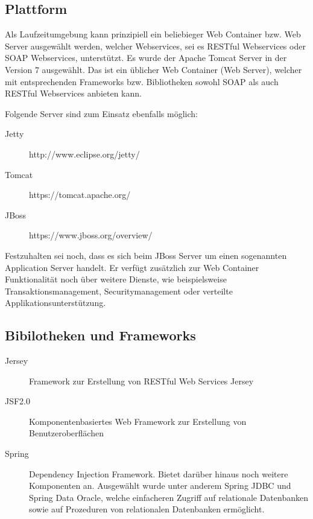 \subsection{Plattform}  \label{sec:plattform}
Als Laufzeitumgebung kann prinzipiell ein beliebieger Web Container bzw. Web Server ausgewählt werden, welcher Webservices, sei es \gls{REST}ful \glspl{Webservice} oder \gls{SOAP} \glspl{Webservice}, unterstützt. 
Es wurde der \gls{Apache Tomcat} Server in der Version 7 ausgewählt. Das ist ein üblicher Web Container (Web Server), welcher mit entsprechenden Frameworks bzw. Bibliotheken sowohl \gls{SOAP} als auch \gls{REST}ful \glspl{Webservice} anbieten kann. 

Folgende Server sind zum Einsatz ebenfalls möglich:

\begin{description}
\item[Jetty] http://www.eclipse.org/jetty/
\item[Tomcat] https://tomcat.apache.org/
\item[JBoss] https://www.jboss.org/overview/
\end{description}

Festzuhalten sei noch, dass es sich beim JBoss Server um einen sogenannten Application Server handelt. Er verfügt zusätzlich zur Web Container Funktionalität noch über weitere Dienste, wie beispielsweise Transaktionsmanagement, Securitymanagement oder verteilte Applikationsunterstützung. 

\subsection{Bibilotheken und Frameworks} \label{sec:bibliotheken_und_frameworks}
\begin{description}

\item[Jersey] Framework zur Erstellung von RESTful Web Services \gls{Jersey}
\item[JSF2.0] Komponentenbasiertes Web Framework zur Erstellung von Benutzeroberflächen 
\item[Spring] Dependency Injection Framework. Bietet darüber hinaus noch weitere Komponenten an. Ausgewählt wurde unter anderem \gls{Spring} JDBC und \gls{Spring} Data Oracle, welche einfacheren Zugriff auf relationale Datenbanken sowie auf Prozeduren von relationalen Datenbanken ermöglicht.  
    
\end{description}

